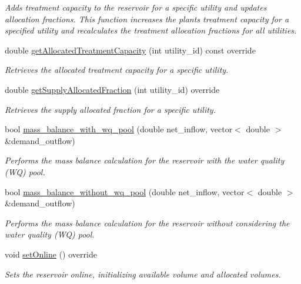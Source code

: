\begin{DoxyCompactItemize}
\begin{DoxyCompactList}\small\item\em Adds treatment capacity to the reservoir for a specific utility and updates allocation fractions. This function increases the plant\textquotesingle{}s treatment capacity for a specified utility and recalculates the treatment allocation fractions for all utilities. \end{DoxyCompactList}\item 
double \mbox{\hyperlink{classAllocatedReservoir_aba81b93e1aa1154ce411248903fabde6}{get\+Allocated\+Treatment\+Capacity}} (int utility\+\_\+id) const override
\begin{DoxyCompactList}\small\item\em Retrieves the allocated treatment capacity for a specific utility. \end{DoxyCompactList}\item 
double \mbox{\hyperlink{classAllocatedReservoir_a114e9cde6a106b786ca0ed39283cbbed}{get\+Supply\+Allocated\+Fraction}} (int utility\+\_\+id) override
\begin{DoxyCompactList}\small\item\em Retrieves the supply allocated fraction for a specific utility. \end{DoxyCompactList}\item 
bool \mbox{\hyperlink{classAllocatedReservoir_a9d025365aa42dfff13a0aac8ea7863fa}{mass\+\_\+balance\+\_\+with\+\_\+wq\+\_\+pool}} (double net\+\_\+inflow, vector$<$ double $>$ \&demand\+\_\+outflow)
\begin{DoxyCompactList}\small\item\em Performs the mass balance calculation for the reservoir with the water quality (WQ) pool. \end{DoxyCompactList}\item 
bool \mbox{\hyperlink{classAllocatedReservoir_ac719b30d5a83ba19ea722449ce9580e1}{mass\+\_\+balance\+\_\+without\+\_\+wq\+\_\+pool}} (double net\+\_\+inflow, vector$<$ double $>$ \&demand\+\_\+outflow)
\begin{DoxyCompactList}\small\item\em Performs the mass balance calculation for the reservoir without considering the water quality (WQ) pool. \end{DoxyCompactList}\item 
void \mbox{\hyperlink{classAllocatedReservoir_a739d93f7981f597a3db0a3d613304b8e}{set\+Online}} () override
\begin{DoxyCompactList}\small\item\em Sets the reservoir online, initializing available volume and allocated volumes. \end{DoxyCompactList}\end{DoxyCompactItemize}
